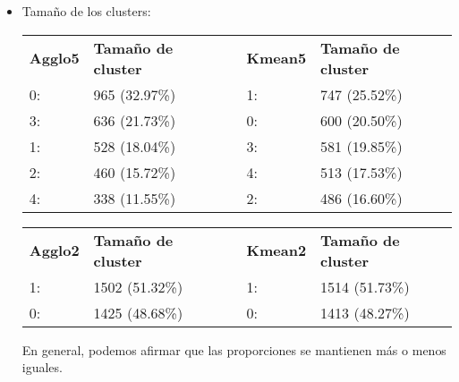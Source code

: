 	\begin{itemize}
		\item Tamaño de los clusters:
		
		\begin{table}[H]
		\centering
				\begin{tabular}{|l|l|l|l|l|}
					\cline{1-2} \cline{4-5}
					\textbf{Agglo5} & \textbf{Tamaño de cluster} & \multirow{6}{*}{} & \textbf{Kmean5} & \textbf{Tamaño de cluster} \\ \cline{1-2} \cline{4-5} 
					0:              & 965 (32.97\%)              &                   & 1:              & 747 (25.52\%)              \\ \cline{1-2} \cline{4-5} 
					3:              & 636 (21.73\%)              &                   & 0:              & 600 (20.50\%)              \\ \cline{1-2} \cline{4-5} 
					1:              & 528 (18.04\%)              &                   & 3:              & 581 (19.85\%)              \\ \cline{1-2} \cline{4-5} 
					2:              & 460 (15.72\%)              &                   & 4:              & 513 (17.53\%)              \\ \cline{1-2} \cline{4-5} 
					4:              & 338 (11.55\%)              &                   & 2:              & 486 (16.60\%)              \\ \cline{1-2} \cline{4-5} 
				\end{tabular}%
			
		\end{table}
		
		
		
		\begin{table}[H]
		\centering
				\begin{tabular}{|l|l|l|l|l|}
					\cline{1-2} \cline{4-5}
					\textbf{Agglo2} & \textbf{Tamaño de cluster} &  & \textbf{Kmean2} & \textbf{Tamaño de cluster} \\ \cline{1-2} \cline{4-5} 
					1:              & 1502 (51.32\%)             &  & 1:              & 1514 (51.73\%)             \\ \cline{1-2} \cline{4-5} 
					0:              & 1425 (48.68\%)             &  & 0:              & 1413 (48.27\%)             \\ \cline{1-2} \cline{4-5} 
				\end{tabular}%
			
		\end{table}
	
		En general, podemos afirmar que las proporciones se mantienen más o menos iguales.
		

\end{itemize}
